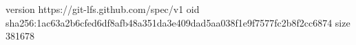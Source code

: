 version https://git-lfs.github.com/spec/v1
oid sha256:1ac63a2b6cfed6df8afb48a351da3e409dad5aa038f1e9f7577fc2b8f2cc6874
size 381678
